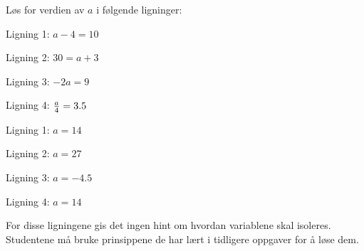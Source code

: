 

Løs for verdien av $a$ i følgende ligninger:

\vskip 20pt

Ligning 1: $a - 4 = 10$

\vskip 10pt

Ligning 2: $30 = a + 3$

\vskip 10pt

Ligning 3: $-2a = 9$

\vskip 10pt

Ligning 4: ${a \over 4} = 3.5$

\vskip 20pt







Ligning 1: $a = 14$

\vskip 10pt

Ligning 2: $a = 27$

\vskip 10pt

Ligning 3: $a = -4.5$

\vskip 10pt

Ligning 4: $a = 14$







For disse ligningene gis det ingen hint om hvordan variablene skal isoleres. Studentene må bruke prinsippene de har lært i tidligere oppgaver for å løse dem.


